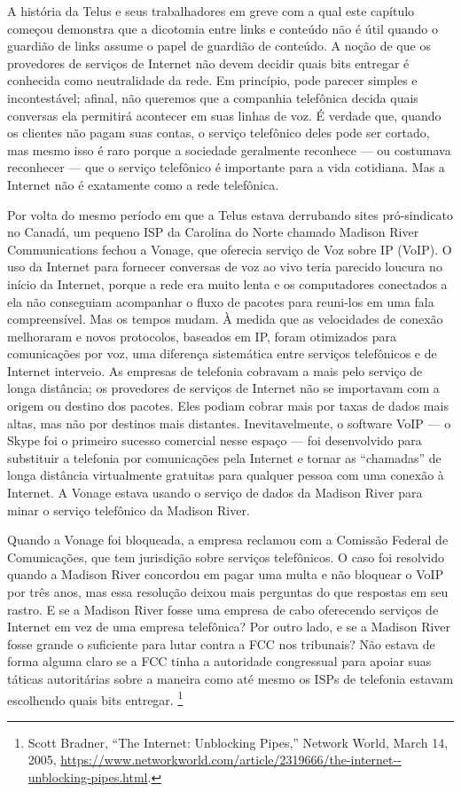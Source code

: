A história da Telus e seus trabalhadores em greve com a qual este capítulo começou demonstra
que a dicotomia entre links e conteúdo não é útil quando o guardião de links assume o papel
de guardião de conteúdo. A noção de que os provedores de serviços de Internet não devem
decidir quais bits entregar é conhecida como neutralidade da rede. Em princípio, pode
parecer simples e incontestável; afinal, não queremos que a companhia telefônica decida
quais conversas ela permitirá acontecer em suas linhas de voz. É verdade que, quando os
clientes não pagam suas contas, o serviço telefônico deles pode ser cortado, mas mesmo isso
é raro porque a sociedade geralmente reconhece --- ou costumava reconhecer --- que o serviço
telefônico é importante para a vida cotidiana. Mas a Internet não é exatamente como a rede
telefônica.

Por volta do mesmo período em que a Telus estava derrubando sites pró-sindicato no Canadá, um
pequeno ISP da Carolina do Norte chamado Madison River Communications fechou a Vonage, que
oferecia serviço de Voz sobre IP (VoIP). O uso da Internet para fornecer conversas de voz ao
vivo teria parecido loucura no início da Internet, porque a rede era muito lenta e os
computadores conectados a ela não conseguiam acompanhar o fluxo de pacotes para reuni-los em
uma fala compreensível. Mas os tempos mudam. À medida que as velocidades de conexão melhoraram
e novos protocolos, baseados em IP, foram otimizados para comunicações por voz, uma diferença
sistemática entre serviços telefônicos e de Internet interveio. As empresas de telefonia
cobravam a mais pelo serviço de longa distância; os provedores de serviços de Internet não se
importavam com a origem ou destino dos pacotes. Eles podiam cobrar mais por taxas de dados mais
altas, mas não por destinos mais distantes. Inevitavelmente, o software VoIP --- o Skype foi o
primeiro sucesso comercial nesse espaço --- foi desenvolvido para substituir a telefonia por
comunicações pela Internet e tornar as ``chamadas'' de longa distância virtualmente gratuitas
para qualquer pessoa com uma conexão à Internet. A Vonage estava usando o serviço de dados da
Madison River para minar o serviço telefônico da Madison River.

Quando a Vonage foi bloqueada, a empresa reclamou com a Comissão Federal de Comunicações, que
tem jurisdição sobre serviços telefônicos. O caso foi resolvido quando a Madison River
concordou em pagar uma multa e não bloquear o VoIP por três anos, mas essa resolução deixou
mais perguntas do que respostas em seu rastro. E se a Madison River fosse uma empresa de cabo
oferecendo serviços de Internet em vez de uma empresa telefônica? Por outro lado, e se a Madison
River fosse grande o suficiente para lutar contra a FCC nos tribunais? Não estava de forma
alguma claro se a FCC tinha a autoridade congressual para apoiar suas táticas autoritárias sobre
a maneira como até mesmo os ISPs de telefonia estavam escolhendo quais bits entregar.
\footnote{Scott Bradner, ``The Internet: Unblocking Pipes,'' Network World, March 14, 2005,
\url{https://www.networkworld.com/article/2319666/the-internet--unblocking-pipes.html}.}

